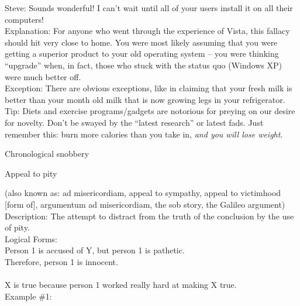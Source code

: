 \documentclass[a4paper,12pt,single,pdftex]{scrartcl}
\begin{document}
{    
      Steve: Sounds wonderful!  I can’t wait until all of your users install it on all their computers!
    \\

    
      Explanation: For anyone who went through the experience of Vista, this fallacy should hit very close to home.  You were most likely assuming that you were getting a superior product to your old operating system -- you were thinking “upgrade” when, in fact, those who stuck with the status quo (Windows XP) were much better off.
    \\

    
      Exception: There are obvious exceptions, like in claiming that your fresh milk is better than your month old milk that is now growing legs in your refrigerator.
    \\

    
      Tip: Diets and exercise programs/gadgets are notorious for preying on our desire for novelty.  Don’t be swayed by the “latest research” or latest fads.  Just remember this: burn more calories than you take in, {\it and you will lose weight}.
    \\

  }


Chronological snobbery

Appeal to pity
    
      (also known as: ad misericordiam, appeal to sympathy, appeal to victimhood [form of], argumentum ad misericordiam, the sob story, the Galileo argument)
    \\

  
    
      Description: The attempt to distract from the truth of the conclusion by the use of pity.
    \\

    
      Logical Forms:
    \\

    
      Person 1 is accused of Y, but person 1 is pathetic.
    \\

    
      Therefore, person 1 is innocent.
    \\

    
       
    \\

    
      X is true because person 1 worked really hard at making X true.
    \\

    
      Example \#1:
    \\
\end{document}
